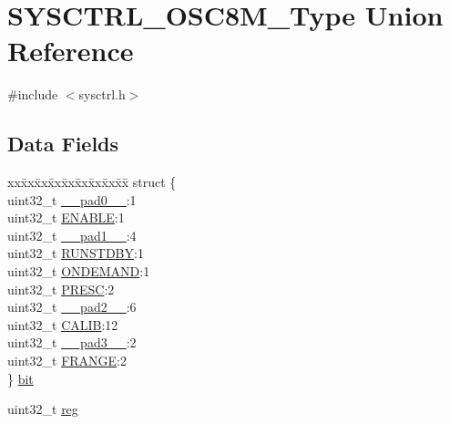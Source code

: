 \hypertarget{union_s_y_s_c_t_r_l___o_s_c8_m___type}{}\section{S\+Y\+S\+C\+T\+R\+L\+\_\+\+O\+S\+C8\+M\+\_\+\+Type Union Reference}
\label{union_s_y_s_c_t_r_l___o_s_c8_m___type}


{\ttfamily \#include $<$sysctrl.\+h$>$}

\subsection*{Data Fields}
\begin{DoxyCompactItemize}
\item 
\begin{tabbing}
xx\=xx\=xx\=xx\=xx\=xx\=xx\=xx\=xx\=\kill
struct \{\\
\>uint32\_t \mbox{\hyperlink{union_s_y_s_c_t_r_l___o_s_c8_m___type_a3e57c2ef1c3ffb36722f000cc1156824}{\_\_pad0\_\_}}:1\\
\>uint32\_t \mbox{\hyperlink{union_s_y_s_c_t_r_l___o_s_c8_m___type_a66f979832c85e0692bd9422b05aff1f7}{ENABLE}}:1\\
\>uint32\_t \mbox{\hyperlink{union_s_y_s_c_t_r_l___o_s_c8_m___type_a6712ba6dd1d5b43d2d56ff8ac4e275a7}{\_\_pad1\_\_}}:4\\
\>uint32\_t \mbox{\hyperlink{union_s_y_s_c_t_r_l___o_s_c8_m___type_a5656560aef3eaf5aac89b68b9fe39c3a}{RUNSTDBY}}:1\\
\>uint32\_t \mbox{\hyperlink{union_s_y_s_c_t_r_l___o_s_c8_m___type_a30dd338f916b14e723a50e2c5c2ad8f2}{ONDEMAND}}:1\\
\>uint32\_t \mbox{\hyperlink{union_s_y_s_c_t_r_l___o_s_c8_m___type_a52a3855939a63f81f3aa6fa215094ea5}{PRESC}}:2\\
\>uint32\_t \mbox{\hyperlink{union_s_y_s_c_t_r_l___o_s_c8_m___type_a9ce12a63de64ef64ae2d59d128251cae}{\_\_pad2\_\_}}:6\\
\>uint32\_t \mbox{\hyperlink{union_s_y_s_c_t_r_l___o_s_c8_m___type_a95f06de3371ee421b89d4be2aae51561}{CALIB}}:12\\
\>uint32\_t \mbox{\hyperlink{union_s_y_s_c_t_r_l___o_s_c8_m___type_a4854608c0e776f0704a4d9a4b98ea57d}{\_\_pad3\_\_}}:2\\
\>uint32\_t \mbox{\hyperlink{union_s_y_s_c_t_r_l___o_s_c8_m___type_a9b49ee81fb25613be3fe8f848de023f5}{FRANGE}}:2\\
\} \mbox{\hyperlink{union_s_y_s_c_t_r_l___o_s_c8_m___type_a376be2c152043b5d5c3ab1559b1a0510}{bit}}\\

\end{tabbing}\item 
uint32\+\_\+t \mbox{\hyperlink{union_s_y_s_c_t_r_l___o_s_c8_m___type_a6b91636401516a477989a336376d7b40}{reg}}
\end{DoxyCompactItemize}


